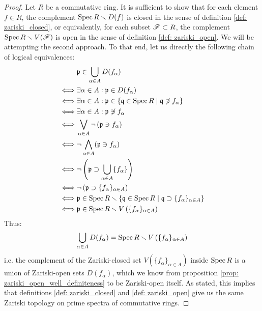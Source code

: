                 \begin{proof}
                    Let $R$ be a commutative ring. It is sufficient to show that for each element $f \in R$, the complement $\operatorname{Spec} R \smallsetminus D(f)$ is closed in the sense of definition \ref{def: zariski_closed}, or equivalently, for each subset $\mathscr{F} \subset R$, the complement $\operatorname{Spec} R \smallsetminus V(\mathscr{F})$ is open in the sense of definition \ref{def: zariski_open}. We will be attempting the second approach. To that end, let us directly the following chain of logical equivalences:
                        $$
                            \begin{aligned}
                                & \mathfrak{p} \in \bigcup_{\alpha \in A} D(f_{\alpha})
                                \\
                                \iff & \exists \alpha \in A: \mathfrak{p} \in D(f_{\alpha})
                                \\
                                \iff & \exists \alpha \in A: \mathfrak{p} \in \{\mathfrak{q} \in \operatorname{Spec} R \mid \mathfrak{q} \not \ni f_{\alpha}\}
                                \\
                                \iff & \exists \alpha \in A: \mathfrak{p} \not \ni f_{\alpha}
                                \\
                                \iff & \bigvee_{\alpha \in A} \neg\left(\mathfrak{p} \ni f_{\alpha}\right)
                                \\
                                \iff & \neg \bigwedge_{\alpha \in A} (\mathfrak{p} \ni f_{\alpha}) 
                                \\
                                \iff & \neg \left(\mathfrak{p} \supset \bigcup_{\alpha \in A} \{f_{\alpha}\}\right)
                                \\
                                \iff & \neg \left(\mathfrak{p} \supset \{f_{\alpha}\}_{\alpha \in A}\right)
                                \\
                                \iff & \mathfrak{p} \in \operatorname{Spec} R \smallsetminus \left\{\mathfrak{q} \in \operatorname{Spec} R \mid \mathfrak{q} \supset \{f_{\alpha}\}_{\alpha \in A}\right\}
                                \\
                                \iff & \mathfrak{p} \in \operatorname{Spec} R \smallsetminus V\left(\{f_{\alpha}\}_{\alpha \in A}\right)
                            \end{aligned}
                        $$
                    Thus:
                        $$\bigcup_{\alpha \in A} D(f_{\alpha}) = \operatorname{Spec} R \smallsetminus V\left(\{f_{\alpha}\}_{\alpha \in A}\right)$$
                    i.e. the complement of the Zariski-closed set $V\left(\{f_{\alpha}\}_{\alpha \in A}\right)$ inside $\operatorname{Spec} R$ is a union of Zariski-open sets $D(f_{\alpha})$, which we know from proposition \ref{prop: zariski_open_well_definiteness} to be Zariski-open itself. As stated, this implies that definitions \ref{def: zariski_closed} and \ref{def: zariski_open} give us the same Zariski topology on prime spectra of commutative rings.
                \end{proof}
